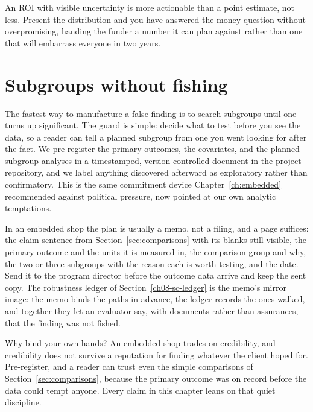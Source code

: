 An ROI with visible uncertainty is more actionable than a point estimate, not less. Present the distribution and you have answered the money question without overpromising, handing the funder a number it can plan against rather than one that will embarrass everyone in two years.

\section{Subgroups without fishing}\label{sec:prereg}
The fastest way to manufacture a false finding is to search subgroups until one turns up significant. The guard is simple: decide what to test before you see the data, so a reader can tell a planned subgroup from one you went looking for after the fact. We pre-register the primary outcomes, the covariates, and the planned subgroup analyses in a timestamped, version-controlled document in the project repository, and we label anything discovered afterward as exploratory rather than confirmatory. This is the same commitment device Chapter~\ref{ch:embedded} recommended against political pressure, now pointed at our own analytic temptations.

In an embedded shop the plan is usually a memo, not a filing, and a page suffices: the claim sentence from Section~\ref{sec:comparisons} with its blanks still visible, the primary outcome and the units it is measured in, the comparison group and why, the two or three subgroups with the reason each is worth testing, and the date. Send it to the program director before the outcome data arrive and keep the sent copy. The robustness ledger of Section~\ref{ch08-sc-ledger} is the memo's mirror image: the memo binds the paths in advance, the ledger records the ones walked, and together they let an evaluator say, with documents rather than assurances, that the finding was not fished.

Why bind your own hands? An embedded shop trades on credibility, and credibility does not survive a reputation for finding whatever the client hoped for. Pre-register, and a reader can trust even the simple comparisons of Section~\ref{sec:comparisons}, because the primary outcome was on record before the data could tempt anyone. Every claim in this chapter leans on that quiet discipline.

